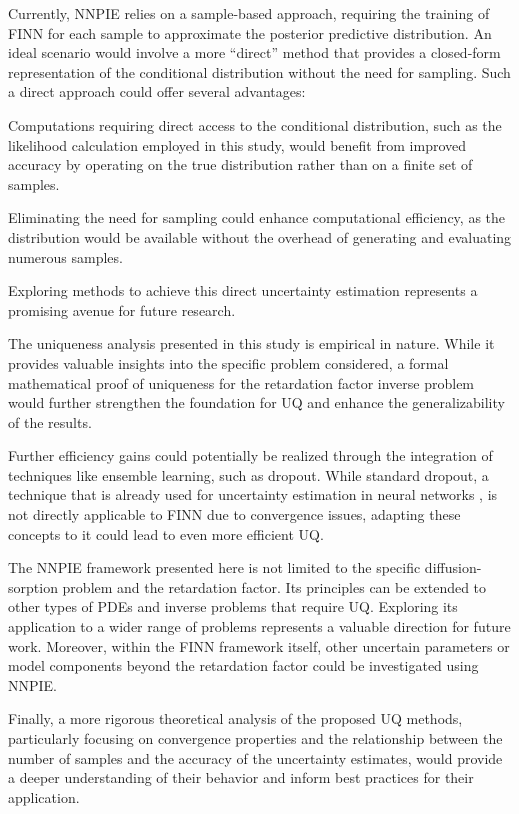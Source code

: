 Currently, NNPIE relies on a sample-based approach, requiring the training of FINN for each sample to approximate the posterior predictive distribution. An ideal scenario would involve a more ``direct'' method that provides a closed-form representation of the conditional distribution without the need for sampling. Such a direct approach could offer several advantages:
\begin{enumerate*}
    \item Computations requiring direct access to the conditional distribution, such as the likelihood calculation employed in this study, would benefit from improved accuracy by operating on the true distribution rather than on a finite set of samples.
    \item Eliminating the need for sampling could enhance computational efficiency, as the distribution would be available without the overhead of generating and evaluating numerous samples.
\end{enumerate*}
Exploring methods to achieve this direct uncertainty estimation represents a promising avenue for future research.

The uniqueness analysis presented in this study is empirical in nature. While it provides valuable insights into the specific problem considered, a formal mathematical proof of uniqueness for the retardation factor inverse problem would further strengthen the foundation for UQ and enhance the generalizability of the results.

Further efficiency gains could potentially be realized through the integration of techniques like ensemble learning, such as dropout. While standard dropout, a technique that is already used for uncertainty estimation in neural networks \cite{gal2016dropout}, is not directly applicable to FINN due to convergence issues, adapting these concepts to it could lead to even more efficient UQ.

The NNPIE framework presented here is not limited to the specific diffusion-sorption problem and the retardation factor. Its principles can be extended to other types of PDEs and inverse problems that require UQ. Exploring its application to a wider range of problems represents a valuable direction for future work.
Moreover, within the FINN framework itself, other uncertain parameters or model components beyond the retardation factor could be investigated using NNPIE.

Finally, a more rigorous theoretical analysis of the proposed UQ methods, particularly focusing on convergence properties and the relationship between the number of samples and the accuracy of the uncertainty estimates, would provide a deeper understanding of their behavior and inform best practices for their application.




